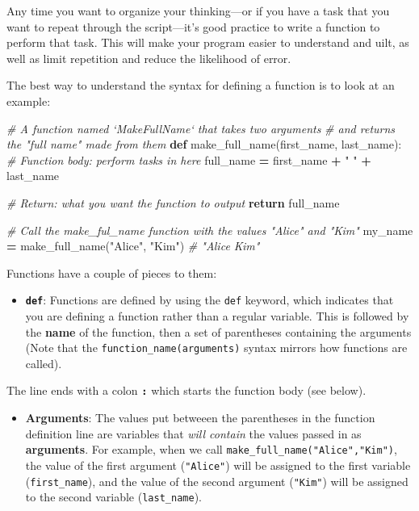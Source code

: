 \documentclass[]{book}
\newenvironment{Shaded}{\begin{snugshade}}{\end{snugshade}}
\newcommand{\KeywordTok}[1]{\textcolor[rgb]{0.13,0.29,0.53}{\textbf{#1}}}
\newcommand{\StringTok}[1]{\textcolor[rgb]{0.31,0.60,0.02}{#1}}
\newcommand{\CommentTok}[1]{\textcolor[rgb]{0.56,0.35,0.01}{\textit{#1}}}
\newcommand{\ControlFlowTok}[1]{\textcolor[rgb]{0.13,0.29,0.53}{\textbf{#1}}}
\newcommand{\OperatorTok}[1]{\textcolor[rgb]{0.81,0.36,0.00}{\textbf{#1}}}
\newcommand{\NormalTok}[1]{#1}
\providecommand{\tightlist}{%
  \setlength{\itemsep}{0pt}\setlength{\parskip}{0pt}}
\begin{document}
Any time you want to organize your thinking---or if you have a task that
you want to repeat through the script---it's good practice to write a
function to perform that task. This will make your program easier to
understand and uilt, as well as limit repetition and reduce the
likelihood of error.

The best way to understand the syntax for defining a function is to look
at an example:

\begin{Shaded}
\begin{Highlighting}[]
\CommentTok{# A function named `MakeFullName` that takes two arguments}
\CommentTok{# and returns the "full name" made from them}
\KeywordTok{def}\NormalTok{ make_full_name(first_name, last_name):}
    \CommentTok{# Function body: perform tasks in here}
\NormalTok{    full_name }\OperatorTok{=}\NormalTok{ first_name }\OperatorTok{+} \StringTok{" "} \OperatorTok{+}\NormalTok{ last_name}

    \CommentTok{# Return: what you want the function to output}
    \ControlFlowTok{return}\NormalTok{ full_name}

\CommentTok{# Call the make_ful_name function with the values "Alice" and "Kim"}
\NormalTok{my_name }\OperatorTok{=}\NormalTok{ make_full_name(}\StringTok{"Alice"}\NormalTok{, }\StringTok{"Kim"}\NormalTok{)  }\CommentTok{# "Alice Kim"}
\end{Highlighting}
\end{Shaded}

Functions have a couple of pieces to them:

\begin{itemize}
\tightlist
\item
  \textbf{\texttt{def}}: Functions are defined by using the \texttt{def}
  keyword, which indicates that you are defining a function rather than
  a regular variable. This is followed by the \textbf{name} of the
  function, then a set of parentheses containing the arguments (Note
  that the \texttt{function\_name(arguments)} syntax mirrors how
  functions are called).
\end{itemize}

The line ends with a colon \textbf{\texttt{:}} which starts the function
body (see below).

\begin{itemize}
\tightlist
\item
  \textbf{Arguments}: The values put betweeen the parentheses in the
  function definition line are variables that \emph{will contain} the
  values passed in as \textbf{arguments}. For example, when we call
  \texttt{make\_full\_name("Alice","Kim")}, the value of the first
  argument (\texttt{"Alice"}) will be assigned to the first variable
  (\texttt{first\_name}), and the value of the second argument
  (\texttt{"Kim"}) will be assigned to the second variable
  (\texttt{last\_name}).
\end{itemize}
\end{document}
